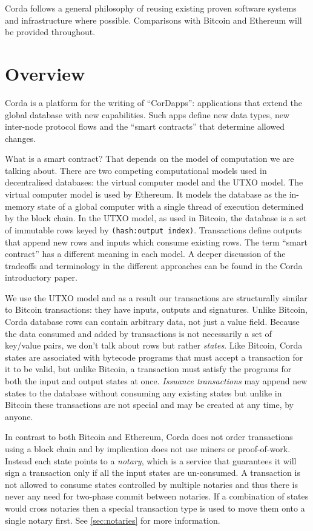 \documentclass{article}
\begin{document}
Corda follows a general philosophy of reusing existing proven software systems and infrastructure where possible.
Comparisons with Bitcoin and Ethereum will be provided throughout.

\newpage

\section{Overview}

Corda is a platform for the writing of ``CorDapps'': applications that extend the global database with new capabilities.
Such apps define new data types, new inter-node protocol flows and the ``smart contracts'' that determine allowed changes.

What is a smart contract? That depends on the model of computation we are talking about. There are two competing
computational models used in decentralised databases: the virtual computer model and the UTXO model. The virtual
computer model is used by Ethereum\cite{Ethereum}. It models the database as the in-memory state of a
global computer with a single thread of execution determined by the block chain. In the UTXO model, as used in
Bitcoin, the database is a set of immutable rows keyed by \texttt{(hash:output index)}. Transactions define
outputs that append new rows and inputs which consume existing rows. The term ``smart contract'' has a different
meaning in each model. A deeper discussion of the tradeoffs and terminology in the different approaches can
be found in the Corda introductory paper\cite{CordaIntro}.

We use the UTXO model and as a result our transactions are structurally similar to Bitcoin transactions: they have
inputs, outputs and signatures. Unlike Bitcoin, Corda database rows can contain arbitrary data, not just a value field.
Because the data consumed and added by transactions is not necessarily a set of key/value pairs, we don't talk about rows
but rather \emph{states}. Like Bitcoin, Corda states are associated with bytecode programs that must accept a transaction
for it to be valid, but unlike Bitcoin, a transaction must satisfy the programs for both the input and output states
at once. \emph{Issuance transactions} may append new states to the database without consuming any existing states but
unlike in Bitcoin these transactions are not special and may be created at any time, by anyone.

In contrast to both Bitcoin and Ethereum, Corda does not order transactions using a block chain and by implication does
not use miners or proof-of-work. Instead each state points to a \emph{notary}, which is a service that guarantees it
will sign a transaction only if all the input states are un-consumed. A transaction is not allowed to consume states
controlled by multiple notaries and thus there is never any need for two-phase commit between notaries. If a combination of
states would cross notaries then a special transaction type is used to move them onto a single notary first. See \cref{sec:notaries}
for more information.
\end{document}

